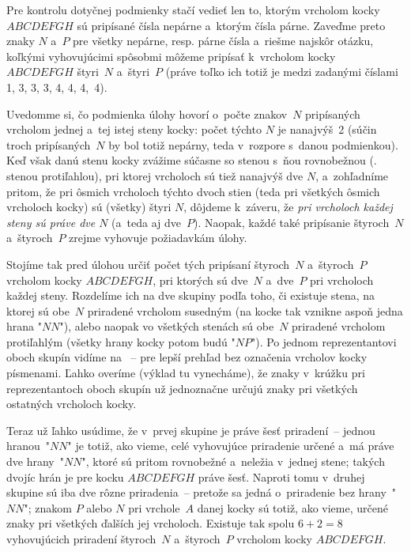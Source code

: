 {%
Pre kontrolu dotyčnej podmienky stačí vedieť len to,
ktorým vrcholom kocky $ABCDEFGH$ sú pripísané čísla nepárne
a~ktorým čísla párne. Zaveďme preto znaky $N$ a~$P$ pre všetky
nepárne, resp. párne čísla a~riešme najskôr otázku, koľkými vyhovujúcimi spôsobmi
môžeme pripísať k~vrcholom kocky $ABCDEFGH$ štyri~$N$ a~štyri~$P$
(práve toľko ich totiž je medzi zadanými číslami
1, 3, 3, 3, 4, 4, 4,~4).

Uvedomme si, čo podmienka úlohy hovorí o~počte znakov~$N$
pripísaných vrcholom jednej a~tej istej steny kocky: počet týchto
$N$ je nanajvýš~2 (súčin troch pripísaných~$N$ by bol totiž nepárny,
teda v~rozpore s~danou podmienkou).
Keď však danú stenu kocky zvážime súčasne so stenou s~ňou
rovnobežnou (\tj. stenou protiľahlou), pri ktorej vrcholoch sú
tiež nanajvýš dve $N$, a~zohľadníme pritom, že pri ôsmich vrcholoch týchto dvoch stien
(teda pri všetkých ôsmich vrcholoch kocky) sú (všetky) štyri $N$,
dôjdeme k~záveru, že {\it pri vrcholoch každej steny sú práve dve $N$}
(a~teda aj dve~$P$). Naopak, každé také pripísanie štyroch~$N$ a~štyroch~$P$
zrejme vyhovuje požiadavkám úlohy.

Stojíme tak pred úlohou určiť počet tých pripísaní štyroch~$N$ a~štyroch~$P$
vrcholom kocky $ABCDEFGH$,
pri ktorých sú dve~$N$ a~dve~$P$ pri vrcholoch každej steny. Rozdelíme
ich na dve skupiny podľa toho, či existuje stena,
na ktorej sú obe~$N$ priradené vrcholom susedným (na kocke tak
vznikne aspoň jedna hrana "$NN$"), alebo naopak
vo všetkých stenách sú obe~$N$ priradené vrcholom
protiľahlým (všetky hrany kocky potom budú "$NP$"). Po jednom reprezentantovi
oboch skupín vidíme na \obr~--
pre lepší prehľad bez označenia vrcholov kocky písmenami. Ľahko
overíme (výklad tu vynecháme), že znaky v~krúžku pri reprezentantoch
oboch skupín už jednoznačne určujú znaky pri všetkých ostatných vrcholoch
kocky.
%

Teraz už ľahko usúdime, že v~prvej skupine je práve šesť priradení~--
jednou hranou~"$NN$" je totiž, ako vieme, celé vyhovujúce priradenie
určené a~má práve dve hrany~"$NN$", ktoré sú pritom rovnobežné
a~neležia v~jednej stene; takých dvojíc hrán je pre kocku
$ABCDEFGH$ práve šesť. Naproti tomu v~druhej skupine sú iba dve rôzne
priradenia~-- pretože sa jedná o~priradenie bez hrany~"$NN$";
znakom $P$ alebo $N$ pri vrchole~$A$ danej kocky
sú totiž, ako vieme, určené znaky pri všetkých ďalších jej vrcholoch.
Existuje tak spolu $6+2=8$ vyhovujúcich priradení
štyroch~$N$ a~štyroch~$P$ vrcholom kocky $ABCDEFGH$.

}
